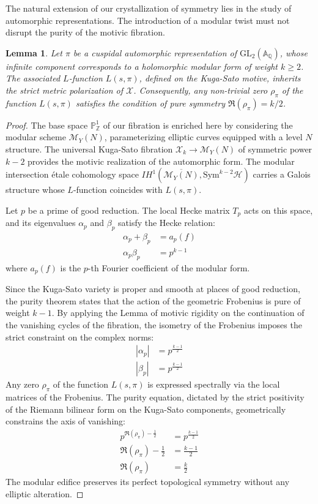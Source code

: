 \documentclass[
]{article}
\newtheorem{lemma}{Lemma}
\begin{document}
The natural extension of our crystallization of symmetry lies in the study of automorphic representations. The introduction of a modular twist must not disrupt the purity of the motivic fibration.

\begin{lemma}
Let $\pi$ be a cuspidal automorphic representation of $\mathrm{GL}_2(\mathbb{A}_{\mathbb{Q}})$, whose infinite component corresponds to a holomorphic modular form of weight $k \ge 2$. The associated $L$-function $L(s, \pi)$, defined on the Kuga-Sato motive, inherits the strict metric polarization of $\mathcal{X}$. Consequently, any non-trivial zero $\rho_{\pi}$ of the function $L(s, \pi)$ satisfies the condition of pure symmetry $\Re(\rho_{\pi}) = k/2$.
\end{lemma}

\begin{proof}
The base space $\mathbb{P}^1_{\mathbb{Z}}$ of our fibration is enriched here by considering the modular scheme $\mathcal{M}_Y(N)$, parameterizing elliptic curves equipped with a level $N$ structure. The universal Kuga-Sato fibration $\mathcal{X}_k \to \mathcal{M}_Y(N)$ of symmetric power $k-2$ provides the motivic realization of the automorphic form.
The modular intersection étale cohomology space $IH^1(\overline{\mathcal{M}_Y(N)}, \mathrm{Sym}^{k-2}\mathcal{H})$ carries a Galois structure whose $L$-function coincides with $L(s, \pi)$.

Let $p$ be a prime of good reduction. The local Hecke matrix $T_p$ acts on this space, and its eigenvalues $\alpha_p$ and $\beta_p$ satisfy the Hecke relation:
\begin{align*}
\alpha_p + \beta_p &= a_p(f) \\
\alpha_p \beta_p &= p^{k-1}
\end{align*}
where $a_p(f)$ is the $p$-th Fourier coefficient of the modular form.

Since the Kuga-Sato variety is proper and smooth at places of good reduction, the purity theorem states that the action of the geometric Frobenius is pure of weight $k-1$. By applying the Lemma of motivic rigidity on the continuation of the vanishing cycles of the fibration, the isometry of the Frobenius imposes the strict constraint on the complex norms:
\begin{align*}
|\alpha_p| &= p^{\frac{k-1}{2}} \\
|\beta_p| &= p^{\frac{k-1}{2}}
\end{align*}
Any zero $\rho_{\pi}$ of the function $L(s, \pi)$ is expressed spectrally via the local matrices of the Frobenius. The purity equation, dictated by the strict positivity of the Riemann bilinear form on the Kuga-Sato components, geometrically constrains the axis of vanishing:
\begin{align*}
p^{\Re(\rho_{\pi}) - \frac{1}{2}} &= p^{\frac{k-1}{2}} \\
\Re(\rho_{\pi}) - \frac{1}{2} &= \frac{k-1}{2} \\
\Re(\rho_{\pi}) &= \frac{k}{2}
\end{align*}
The modular edifice preserves its perfect topological symmetry without any elliptic alteration.
\end{proof}
\end{document}
